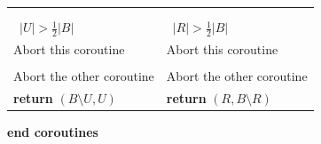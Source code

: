 \documentclass[a4paper,10pt]{article}
\theoremstyle{definition}
\theoremstyle{plain}
\newcommand{\bigo}[1]{{O\!\left(#1\right)}}
\newcommand{\size}[1]{\left\lvert #1 \right\rvert}
\newlength{\halflineskip}
\newcommand{\rightbrace}[3][0]{\setlength{\halflineskip}{0.5\baselineskip}\hspace{0pt plus 1filll}\makebox[0pt][l]{\smash{\tikz[baseline=#1\baselineskip]{\draw[thick,color=gray,line cap=round,decorate,decoration={brace,amplitude=2.3pt}] (0pt,0.7\baselineskip) ++(0.1em,0) -- ++(0pt,-#2\baselineskip+1pt) (5pt,\halflineskip-#2\halflineskip) node[color=gray,right,inner sep=0.1em,anchor=base west]{\small #3};}}}}
\begin{document}
\begin{algorithm}[tb]
\begin{algorithmic}[1]
\begin{tabular}{@{}p{5.95cm}||p{4.92cm}@{}}
		\STATE	\hspace*{2\algorithmicindent}\algorithmicendfor                                                                           & \hspace*{\algorithmicindent}\algorithmicendfor\\
		\STATE	\hspace*{\algorithmicindent}\algorithmicendfor\label{alg:line-handle-state-loopend}                                       & \algorithmicendfor\\
		\STATE	\hspace*{\algorithmicindent}\algorithmicif\ $\size{U}>\frac{1}{2}\size{B}$ \algorithmicthen                               & \algorithmicif\ $\size{R}>\frac{1}{2}\size{B}$ \algorithmicthen\rightbrace{5}{$\bigo{1}$}\\
		\STATE	\hspace*{2\algorithmicindent}Abort this coroutine                                                                         & \hspace*{\algorithmicindent}Abort this coroutine\\
		\STATE	\hspace*{\algorithmicindent}\algorithmicendif                                                                             & \algorithmicendif\\
		\STATE	\hspace*{\algorithmicindent}Abort the other coroutine                                                                     & Abort the other coroutine \\
		\STATE	\hspace*{\algorithmicindent}\textbf{return} $(B\setminus U,U)$\label{alg:line-return}                                     & \textbf{return} $(R,B\setminus R)$\\
	\end{tabular}\setlength{\itemsep}{0cm}%
	\STATE	\textbf{end coroutines}\\

\end{algorithmic}
\end{algorithm}
\end{document}
